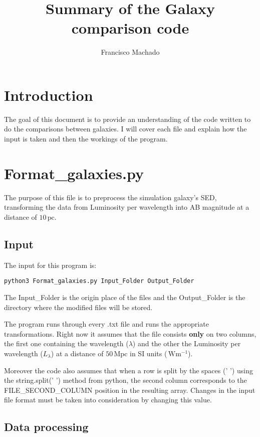 \documentclass[11pt]{report}
\author{Francisco Machado}
\title{Summary of the Galaxy comparison code}
\newcommand{\unit}[1]{\ensuremath{\, \mathrm{#1}}}
\begin{document}
\maketitle

\section{Introduction}

The goal of this document is to provide an understanding of the code written to do the comparisons between galaxies.
I will cover each file and explain how the input is taken and then the workings of the program.

\section{Format\_galaxies.py}

The purpose of this file is to preprocess the simulation galaxy's SED, transforming the data from Luminosity per wavelength into AB magnitude at a distance of $10 \unit{pc}$.

\subsection{Input}

The input for this program is:
\begin{verbatim}
python3 Format_galaxies.py Input_Folder Output_Folder
\end{verbatim}

The Input\_Folder is the origin place of the files and the Output\_Folder is the directory where the modified files will be stored.

The program runs through every .txt file and runs the appropriate transformations. Right now it assumes that the file consists {\bf only} on two columns, the first one containing the wavelength ($\lambda$) and the other the Luminosity per wavelength ($L_\lambda$) at a distance of $50 \unit{Mpc}$ in SI units ($\unit{W m^{-1}}$).


Moreover the code also assumes that when a row is split by the spaces (' ') using the string.split(' ') method from python, the second column corresponds to the FILE\_SECOND\_COLUMN position in the resulting array. Changes in the input file format must be taken into consideration by changing this value.

\subsection{Data processing}
\end{document}
